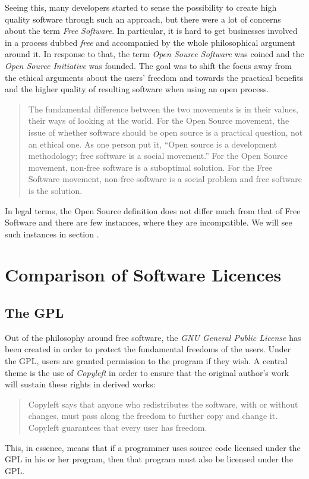 \documentclass{article}
\begin{document}
Seeing this, many developers started to sense the possibility to
create high quality software through such an approach, but there
were a lot of concerns about the term \emph{Free Software}. In
particular, it is hard to get businesses involved in a process
dubbed \emph{free} and accompanied by the whole philosophical
argument around it. In response to that, the term
\emph{Open Source Software} was coined and the
\emph{Open Source Initiative} was founded. The goal was to shift
the focus away from the ethical arguments about the users' freedom
and towards the 
practical benefits and the higher quality of resulting software
when using an open process.
\begin{quote}
The fundamental difference between the two movements is in their
values, their ways of looking at the world. For the Open Source
movement, the issue of whether software should be open source
is a practical question, not an ethical one. As one person put it,
``Open source is a development methodology; free software is a social
movement.'' For the Open Source movement, non-free software is a
suboptimal solution. For the Free Software movement, non-free
software is a social problem and free software is the solution.
\end{quote}
In legal terms, the Open Source
definition does not differ much from that of Free Software and there
are few instances, where they are incompatible. We will see
such instances in section .
\section{Comparison of Software Licences}
\subsection{The GPL}
Out of the philosophy around free software, the 
\emph{GNU General Public License} has been
created in order to protect the fundamental freedoms of the users.
Under the GPL, users are granted permission to 
 the program if they wish.
A central theme is the use of \emph{Copyleft} in order to ensure
that the original author's work will sustain these rights in
derived works:
\begin{quote}
Copyleft says that anyone who redistributes the software,
with or without changes, must pass along the freedom to further
copy and change it. Copyleft guarantees that every user has freedom.
\end{quote}
This, in essence, means that if a programmer uses source code
licensed under the GPL in his or her program, then that program
must also be licensed under the GPL.
\end{document}
